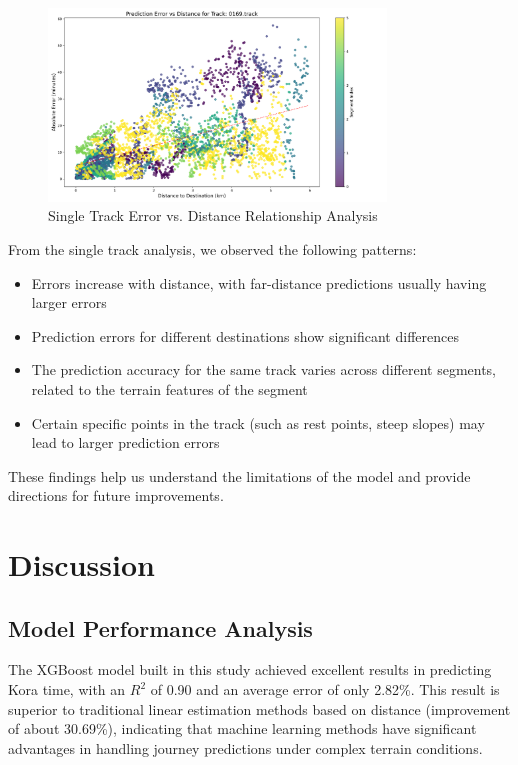 \documentclass[12pt]{article}
\begin{document}
\begin{figure}[H]
\centering
\includegraphics[width=0.8\textwidth]{visualization_results/track_error_vs_distance_0169.track.png}
\caption{Single Track Error vs. Distance Relationship Analysis}
\label{fig:track_error_dist}
\end{figure}

From the single track analysis, we observed the following patterns:

\begin{itemize}
  \item Errors increase with distance, with far-distance predictions usually having larger errors
  \item Prediction errors for different destinations show significant differences
  \item The prediction accuracy for the same track varies across different segments, related to the terrain features of the segment
  \item Certain specific points in the track (such as rest points, steep slopes) may lead to larger prediction errors
\end{itemize}

These findings help us understand the limitations of the model and provide directions for future improvements.

\section{Discussion}

\subsection{Model Performance Analysis}

The XGBoost model built in this study achieved excellent results in predicting Kora time, with an $R^2$ of 0.90 and an average error of only 2.82\%. This result is superior to traditional linear estimation methods based on distance (improvement of about 30.69\%), indicating that machine learning methods have significant advantages in handling journey predictions under complex terrain conditions.
\end{document}
